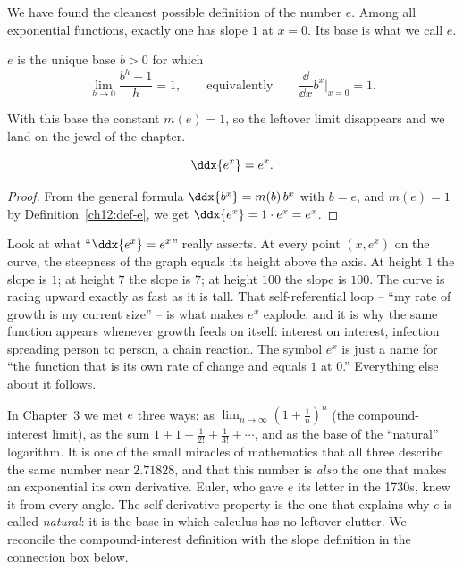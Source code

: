 We have found the cleanest possible definition of the number $e$. Among all
exponential functions, exactly one has slope $1$ at $x=0$. Its base is what
we call $e$.

\begin{definition}
\label{ch12:def-e}
$e$ is the unique base $b>0$ for which
\[
   \lim_{h\to 0}\frac{b^h-1}{h} = 1,
   \qquad\text{equivalently}\qquad
   \frac{\dd}{\dd x}b^x\Big|_{x=0} = 1.
\]
\end{definition}

With this base the constant $m(e)=1$, so the leftover limit disappears and
we land on the jewel of the chapter.

\begin{theorem}
\label{ch12:thm-ex}
\[
   \ddx{e^x} = e^x.
\]
\end{theorem}

\begin{proof}
From the general formula $\ddx{b^x}=m(b)\,b^x$ with $b=e$, and
$m(e)=1$ by Definition~\ref{ch12:def-e}, we get $\ddx{e^x}=1\cdot e^x = e^x$.
\end{proof}

\begin{happeningbox}
Look at what ``$\ddx{e^x}=e^x$'' really asserts. At every point $(x, e^x)$
on the curve, the steepness of the graph equals its height above the axis.
At height $1$ the slope is $1$; at height $7$ the slope is $7$; at height
$100$ the slope is $100$. The curve is racing upward exactly as fast as it
is tall. That self-referential loop -- ``my rate of growth is my current
size'' -- is what makes $e^x$ explode, and it is why the same function
appears whenever growth feeds on itself: interest on interest, infection
spreading person to person, a chain reaction. The symbol $e^x$ is just a
name for ``the function that is its own rate of change and equals $1$ at
$0$.'' Everything else about it follows.
\end{happeningbox}

\begin{historybox}
In Chapter~3 we met $e$ three ways: as $\lim_{n\to\infty}(1+\tfrac1n)^n$
(the compound-interest limit), as the sum
$1 + 1 + \tfrac1{2!} + \tfrac1{3!}+\cdots$, and as the base of the
``natural'' logarithm. It is one of the small miracles of mathematics that
all three describe the same number near $2.71828$, and that this number is
\emph{also} the one that makes an exponential its own derivative. Euler, who
gave $e$ its letter in the 1730s, knew it from every angle. The
self-derivative property is the one that explains why $e$ is called
\emph{natural}: it is the base in which calculus has no leftover clutter. We
reconcile the compound-interest definition with the slope definition in the
connection box below.
\end{historybox}

